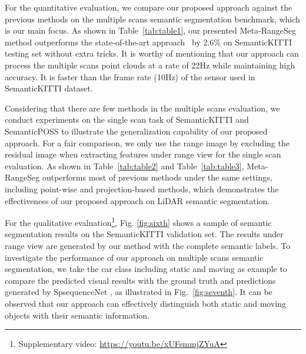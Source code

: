 \documentclass[letterpaper, 10 pt, journal, twoside]{ieeetran}
\begin{document}
For the quantitative evaluation, we compare our proposed approach against the previous methods on the multiple scans semantic segmentation benchmark, which is our main focus. As shown in Table~\ref{tab:table1}, our presented Meta-RangeSeg method outperforms the state-of-the-art approach~\cite{schutt2022abstract} by 2.6\% on SemanticKITTI testing set without extra tricks.
It is worthy of mentioning that our approach can process the multiple scans point clouds at a rate of 22Hz while maintaining high accuracy. It is faster than the frame rate (10Hz) of the sensor used in SemanticKITTI dataset.  

Considering that there are few methods in the multiple scans evaluation, we conduct experiments on the single scan task of SemanticKITTI and SemanticPOSS to illustrate the generalization capability of our proposed approach. For a fair comparison, we only use the range image by excluding the residual image when extracting features under range view for the single scan evaluation. As shown in Table~\ref{tab:table2} and Table~\ref{tab:table3}, Meta-RangeSeg outperforms most of previous methods under the same settings, including point-wise and projection-based methods, which demonstrates the effectiveness of our proposed approach on LiDAR semantic segmentation. 

For the qualitative evaluation\footnote{Supplementary video: \url{https://youtu.be/xUFsmmjZYuA}}, Fig. \ref{fig:sixth} shows a sample of semantic segmentation results on the SemanticKITTI validation set. The results under range view are generated by our method with the complete semantic labels. To investigate the performance of our approach on multiple scans semantic segmentation, we take the car class including static and moving as example to compare the predicted visual results with the ground truth and predictions generated by SpsequenceNet \cite{shi2020spsequencenet}, as illustrated in Fig.~\ref{fig:seventh}. It can be observed that our approach can effectively distinguish both static and moving objects with their semantic information. 
\end{document}
